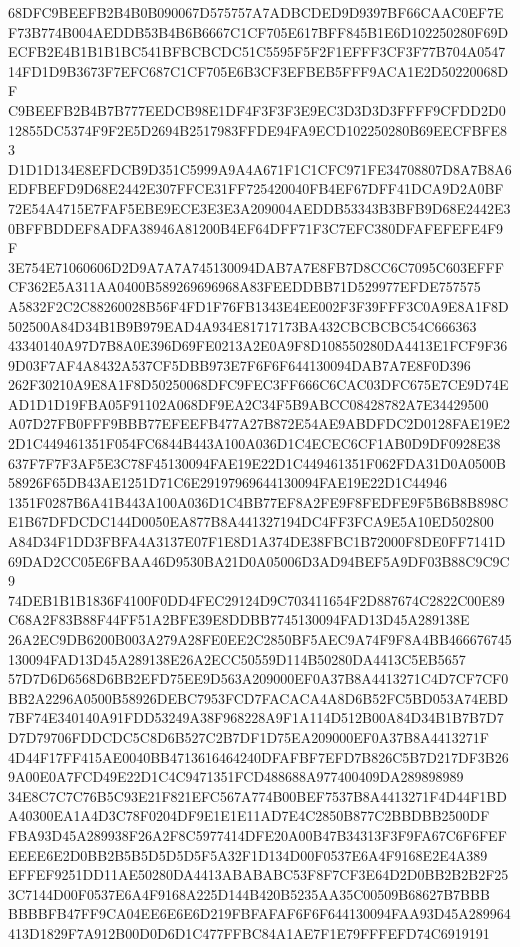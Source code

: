 \documentclass[UTF8,fontset=fandol,zihao=-4,a4paper]{ctexart}
\begin{document}
{{68DFC9BEEFB2B4B0B090067D575757A7ADBCDED9D9397BF66CAAC0EF7EF73B774B004AEDDB53B4B6B6667C1CF705E617BFF845B1E6D102250280F69D
ECFB2E4B1B1B1BC541BFBCBCDC51C5595F5F2F1EFFF3CF3F77B704A054714FD1D9B3673F7EFC687C1CF705E6B3CF3EFBEB5FFF9ACA1E2D50220068DF
C9BEEFB2B4B7B777EEDCB98E1DF4F3F3F3E9EC3D3D3D3FFFF9CFDD2D012855DC5374F9F2E5D2694B2517983FFDE94FA9ECD102250280B69EECFBFE83
D1D1D134E8EFDCB9D351C5999A9A4A671F1C1CFC971FE34708807D8A7B8A6EDFBEFD9D68E2442E307FFCE31FF725420040FB4EF67DFF41DCA9D2A0BF
72E54A4715E7FAF5EBE9ECE3E3E3A209004AEDDB53343B3BFB9D68E2442E30BFFBDDEF8ADFA38946A81200B4EF64DFF71F3C7EFC380DFAFEFEFE4F9F
3E754E71060606D2D9A7A7A745130094DAB7A7E8FB7D8CC6C7095C603EFFFCF362E5A311AA0400B589269696968A83FEEDDBB71D529977EFDE757575
A5832F2C2C88260028B56F4FD1F76FB1343E4EE002F3F39FFF3C0A9E8A1F8D502500A84D34B1B9B979EAD4A934E81717173BA432CBCBCBC54C666363
43340140A97D7B8A0E396D69FE0213A2E0A9F8D108550280DA4413E1FCF9F369D03F7AF4A8432A537CF5DBB973E7F6F6F644130094DAB7A7E8F0D396
262F30210A9E8A1F8D50250068DFC9FEC3FF666C6CAC03DFC675E7CE9D74EAD1D1D19FBA05F91102A068DF9EA2C34F5B9ABCC08428782A7E34429500
A07D27FB0FFF9BBB77EFEEFB477A27B872E54AE9ABDFDC2D0128FAE19E22D1C449461351F054FC6844B443A100A036D1C4ECEC6CF1AB0D9DF0928E38
637F7F7F3AF5E3C78F45130094FAE19E22D1C449461351F062FDA31D0A0500B58926F65DB43AE1251D71C6E29197969644130094FAE19E22D1C44946
1351F0287B6A41B443A100A036D1C4BB77EF8A2FE9F8FEDFE9F5B6B8B898CE1B67DFDCDC144D0050EA877B8A441327194DC4FF3FCA9E5A10ED502800
A84D34F1DD3FBFA4A3137E07F1E8D1A374DE38FBC1B72000F8DE0FF7141D69DAD2CC05E6FBAA46D9530BA21D0A05006D3AD94BEF5A9DF03B88C9C9C9
74DEB1B1B1836F4100F0DD4FEC29124D9C703411654F2D887674C2822C00E89C68A2F83B88F44FF51A2BFE39E8DDBB7745130094FAD13D45A289138E
26A2EC9DB6200B003A279A28FE0EE2C2850BF5AEC9A74F9F8A4BB466676745130094FAD13D45A289138E26A2ECC50559D114B50280DA4413C5EB5657
57D7D6D6568D6BB2EFD75EE9D563A209000EF0A37B8A4413271C4D7CF7CF0BB2A2296A0500B58926DEBC7953FCD7FACACA4A8D6B52FC5BD053A74EBD
7BF74E340140A91FDD53249A38F968228A9F1A114D512B00A84D34B1B7B7D7D7D79706FDDCDC5C8D6B527C2B7DF1D75EA209000EF0A37B8A4413271F
4D44F17FF415AE0040BB4713616464240DFAFBF7EFD7B826C5B7D217DF3B269A00E0A7FCD49E22D1C4C9471351FCD488688A977400409DA289898989
34E8C7C7C76B5C93E21F821EFC567A774B00BEF7537B8A4413271F4D44F1BDA40300EA1A4D3C78F0204DF9E1E1E11AD7E4C2850B877C2BBDBB2500DF
FBA93D45A289938F26A2F8C5977414DFE20A00B47B34313F3F9FA67C6F6FEFEEEE6E2D0BB2B5B5D5D5D5F5A32F1D134D00F0537E6A4F9168E2E4A389
EFFEF9251DD11AE50280DA4413ABABABC53F8F7CF3E64D2D0BB2B2B2F253C7144D00F0537E6A4F9168A225D144B420B5235AA35C00509B68627B7BBB
BBBBFB47FF9CA04EE6E6E6D219FBFAFAF6F6F644130094FAA93D45A289964413D1829F7A912B00D0D6D1C477FFBC84A1AE7F1E79FFFEFD74C6919191
}}
\end{document}
